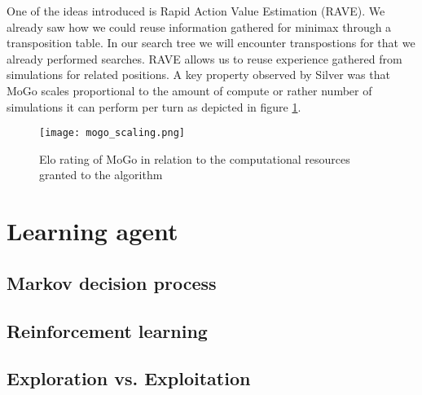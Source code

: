 One of the ideas introduced is Rapid Action Value Estimation (RAVE). We already saw how we could reuse information gathered for minimax through a transposition table. In our search tree we will encounter transpostions for that we already performed searches. RAVE allows us to reuse experience gathered from simulations for related positions. A key property observed by Silver was that MoGo scales proportional to the amount of compute or rather number of simulations it can perform per turn as depicted in figure \ref{mogo_scaling}.


\begin{figure}
    \centering
    \texttt{[image: mogo\_scaling.png]}
    \caption{Elo rating of MoGo in relation to the computational resources granted to the algorithm \cite{gelly_monte-carlo_2011}}
    \label{mogo_scaling}
\end{figure}



\section{Learning agent}

\subsection{Markov decision process}

\subsection{Reinforcement learning}

\subsection{Exploration vs. Exploitation}
\label{exploration_vs_exploitation}